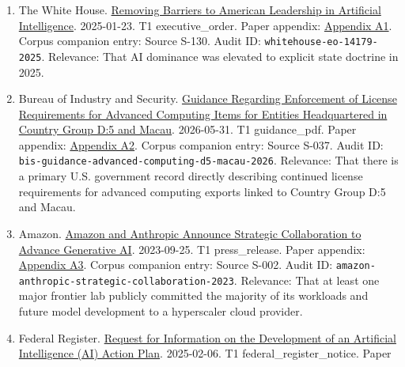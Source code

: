 \documentclass[
  american,
  11pt,
  letterpaper,
]{article}
\providecommand{\tightlist}{%
  \setlength{\itemsep}{0pt}\setlength{\parskip}{0pt}}
\begin{document}
\begin{enumerate}
\def\labelenumi{\arabic{enumi}.}
\tightlist
\item
  The White House.
  \href{https://www.whitehouse.gov/presidential-actions/2025/01/removing-barriers-to-american-leadership-in-artificial-intelligence/}{Removing
  Barriers to American Leadership in Artificial Intelligence}.
  2025-01-23. T1 executive\_order. Paper appendix:
  \hyperref[ch-07-appendix-a1-removing-barriers-to-american-leadership-in-artificial-intelligence]{Appendix
  A1}. Corpus companion entry: Source S-130. Audit ID:
  \texttt{whitehouse-eo-14179-2025}. Relevance: That AI dominance was
  elevated to explicit state doctrine in 2025.
\item
  Bureau of Industry and Security.
  \href{https://www.bis.gov/media/documents/bis-guidance-may-31-2026.pdf}{Guidance
  Regarding Enforcement of License Requirements for Advanced Computing
  Items for Entities Headquartered in Country Group D:5 and Macau}.
  2026-05-31. T1 guidance\_pdf. Paper appendix:
  \hyperref[ch-07-appendix-a2-guidance-regarding-enforcement-of-license-requirements-for-advanced-computing-items-for-entities-headquartered-in-country-group-d-5-and-macau]{Appendix
  A2}. Corpus companion entry: Source S-037. Audit ID:
  \texttt{bis-guidance-advanced-computing-d5-macau-2026}. Relevance:
  That there is a primary U.S. government record directly describing
  continued license requirements for advanced computing exports linked
  to Country Group D:5 and Macau.
\item
  Amazon.
  \href{https://press.aboutamazon.com/2023/9/amazon-and-anthropic-announce-strategic-collaboration-to-advance-generative-ai}{Amazon
  and Anthropic Announce Strategic Collaboration to Advance Generative
  AI}. 2023-09-25. T1 press\_release. Paper appendix:
  \hyperref[ch-07-appendix-a3-amazon-and-anthropic-announce-strategic-collaboration-to-advance-generative-ai]{Appendix
  A3}. Corpus companion entry: Source S-002. Audit ID:
  \texttt{amazon-anthropic-strategic-collaboration-2023}. Relevance:
  That at least one major frontier lab publicly committed the majority
  of its workloads and future model development to a hyperscaler cloud
  provider.
\item
  Federal Register.
  \href{https://www.federalregister.gov/documents/2025/02/06/2025-02305/request-for-information-on-the-development-of-an-artificial-intelligence-ai-action-plan}{Request
  for Information on the Development of an Artificial Intelligence (AI)
  Action Plan}. 2025-02-06. T1 federal\_register\_notice. Paper

\end{enumerate}
\end{document}
